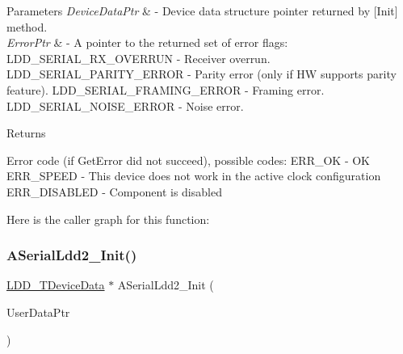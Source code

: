\begin{DoxyParams}{Parameters}
{\em Device\+Data\+Ptr} & -\/ Device data structure pointer returned by \mbox{[}Init\mbox{]} method. \\
\hline
{\em Error\+Ptr} & -\/ A pointer to the returned set of error flags\+: L\+D\+D\+\_\+\+S\+E\+R\+I\+A\+L\+\_\+\+R\+X\+\_\+\+O\+V\+E\+R\+R\+UN -\/ Receiver overrun. L\+D\+D\+\_\+\+S\+E\+R\+I\+A\+L\+\_\+\+P\+A\+R\+I\+T\+Y\+\_\+\+E\+R\+R\+OR -\/ Parity error (only if HW supports parity feature). L\+D\+D\+\_\+\+S\+E\+R\+I\+A\+L\+\_\+\+F\+R\+A\+M\+I\+N\+G\+\_\+\+E\+R\+R\+OR -\/ Framing error. L\+D\+D\+\_\+\+S\+E\+R\+I\+A\+L\+\_\+\+N\+O\+I\+S\+E\+\_\+\+E\+R\+R\+OR -\/ Noise error. \\
\hline
\end{DoxyParams}
\begin{DoxyReturn}{Returns}

\begin{DoxyItemize}
\item Error code (if Get\+Error did not succeed), possible codes\+: E\+R\+R\+\_\+\+OK -\/ OK E\+R\+R\+\_\+\+S\+P\+E\+ED -\/ This device does not work in the active clock configuration E\+R\+R\+\_\+\+D\+I\+S\+A\+B\+L\+ED -\/ Component is disabled 
\end{DoxyItemize}
\end{DoxyReturn}
Here is the caller graph for this function\+:
\mbox{\label{group___a_serial_ldd2__module_gaa0cd7e49c9c5deb19ce7f9ece16231c3}} 
\subsubsection{\texorpdfstring{A\+Serial\+Ldd2\+\_\+\+Init()}{ASerialLdd2\_Init()}}
{\footnotesize\ttfamily \hyperlink{group___p_e___types__module_gac5cf1362f1f0e3a2ce71b1bf2276d091}{L\+D\+D\+\_\+\+T\+Device\+Data} $\ast$ A\+Serial\+Ldd2\+\_\+\+Init (\begin{DoxyParamCaption}\item[{\hyperlink{group___p_e___types__module_ga0b66a73f87238a782318aa0be7578e35}{L\+D\+D\+\_\+\+T\+User\+Data} $\ast$}]{User\+Data\+Ptr }\end{DoxyParamCaption})}




